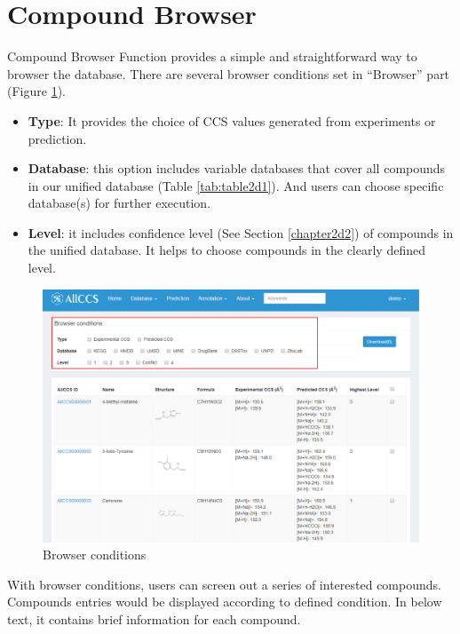 \documentclass[12pt,]{book}
\providecommand{\tightlist}{%
  \setlength{\itemsep}{0pt}\setlength{\parskip}{0pt}}
\begin{document}
\section{Compound Browser}\label{chapter2d1}

Compound Browser Function provides a simple and straightforward way to
browser the database. There are several browser conditions set in
``Browser'' part (Figure \ref{fig:figure2d1}).

\begin{itemize}
\tightlist
\item
  \textbf{Type}: It provides the choice of CCS values generated from
  experiments or prediction.
\item
  \textbf{Database}: this option includes variable databases that cover
  all compounds in our unified database (Table \ref{tab:table2d1}). And
  users can choose specific database(s) for further execution.
\item
  \textbf{Level}: it includes confidence level (See Section
  \ref{chapter2d2}) of compounds in the unified database. It helps to
  choose compounds in the clearly defined level.
\end{itemize}

\begin{figure}

{\centering \includegraphics{images/chapter2/figure2.1browser_condition} 

}

\caption{Browser conditions}\label{fig:figure2d1}
\end{figure}

With browser conditions, users can screen out a series of interested
compounds. Compounds entries would be displayed according to defined
condition. In below text, it contains brief information for each
compound.
\end{document}
